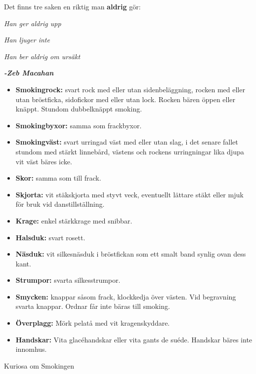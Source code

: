     Det finns tre saken en riktig man \textbf{aldrig} gör:

    \textit{Han ger aldrig upp}
    
    \textit{Han ljuger inte}
    
    \textit{Han ber aldrig om ursäkt}
    
    \textit{\textbf{-Zeb Macahan}} 


    \begin{itemize}
        
        \item[]\textbf{Smokingrock:} svart rock med eller utan sidenbeläggning, rocken med eller utan bröstficka, sidofickor med eller utan lock. Rocken bären öppen eller knäppt. Stundom dubbelknäppt smoking.
        
        \item[]\textbf{Smokingbyxor:} samma som frackbyxor.
        
        \item[]\textbf{Smokingväst:} svart urringad väst med eller utan slag, i det senare fallet stundom med stärkt linnebård, västens och rockens urringningar lika djupa vit väst bäres icke.
        
        \item[]\textbf{Skor:} samma som till frack.
        
        \item[]\textbf{Skjorta:} vit stäkskjorta med styvt veck, eventuellt lättare stäkt eller mjuk för bruk vid danstillställning.
        
        \item[]\textbf{Krage:} enkel stärkkrage med snibbar.
        
        \item[]\textbf{Halsduk:} svart rosett.
        
        \item[]\textbf{Näsduk:} vit silkesnäsduk i bröstfickan som ett smalt band synlig ovan dess kant.
        
        \item[]\textbf{Strumpor:} svarta silkesstrumpor.
        
        \item[]\textbf{Smycken:} knappar såsom frack, klockkedja över västen. Vid begravning svarta knappar. Ordnar får inte bäras till smoking.
        
        \item[]\textbf{Överplagg:} Mörk pelatå med vit kragenskyddare.
        
        \item[]\textbf{Handskar:} Vita glacéhandskar eller vita gants de suéde. Handskar bäres inte innomhus.
        
    \end{itemize}
    Kuriosa om Smokingen

